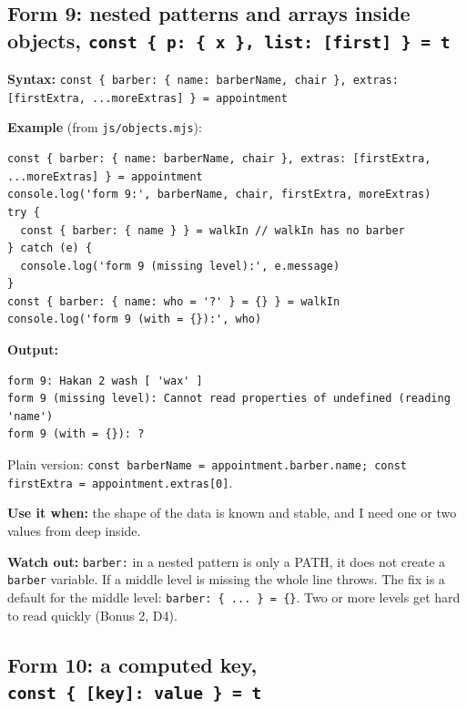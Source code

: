 \subsection{\texorpdfstring{Form 9: nested patterns and arrays inside objects, \texttt{const\ \{\ p:\ \{\ x\ \},\ list:\ {[}first{]}\ \}\ =\ t}}{Form 9: nested patterns and arrays inside objects, const \{ p: \{ x \}, list: {[}first{]} \} = t}}\label{form-9-nested-patterns-and-arrays-inside-objects-const-p-x-list-first-t}

\textbf{Syntax:} \passthrough{\lstinline!const \{ barber: \{ name: barberName, chair \}, extras: [firstExtra, ...moreExtras] \} = appointment!}

\textbf{Example} (from \passthrough{\lstinline!js/objects.mjs!}):

\begin{lstlisting}
const { barber: { name: barberName, chair }, extras: [firstExtra, ...moreExtras] } = appointment
console.log('form 9:', barberName, chair, firstExtra, moreExtras)
try {
  const { barber: { name } } = walkIn // walkIn has no barber
} catch (e) {
  console.log('form 9 (missing level):', e.message)
}
const { barber: { name: who = '?' } = {} } = walkIn
console.log('form 9 (with = {}):', who)
\end{lstlisting}

\textbf{Output:}

\begin{lstlisting}
form 9: Hakan 2 wash [ 'wax' ]
form 9 (missing level): Cannot read properties of undefined (reading 'name')
form 9 (with = {}): ?
\end{lstlisting}

Plain version: \passthrough{\lstinline!const barberName = appointment.barber.name; const firstExtra = appointment.extras[0]!}.

\textbf{Use it when:} the shape of the data is known and stable, and I need one or two values from deep inside.

\textbf{Watch out:} \passthrough{\lstinline!barber:!} in a nested pattern is only a PATH, it does not create a \passthrough{\lstinline!barber!} variable.
If a middle level is missing the whole line throws. The fix is a default for the middle level: \passthrough{\lstinline!barber: \{ ... \} = \{\}!}.
Two or more levels get hard to read quickly (Bonus 2, D4).

\subsection{\texorpdfstring{Form 10: a computed key, \texttt{const\ \{\ {[}key{]}:\ value\ \}\ =\ t}}{Form 10: a computed key, const \{ {[}key{]}: value \} = t}}\label{form-10-a-computed-key-const-key-value-t}

